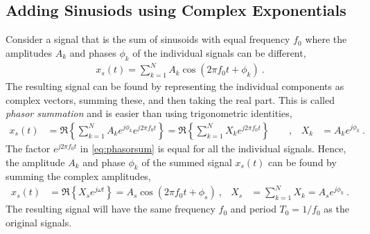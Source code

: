 \subsection{Adding Sinusiods using Complex Exponentials}
Consider a signal that is the sum of sinusoids with equal frequency $f_0$ where the amplitudes $A_k$ and phases $\phi_k$ of the individual signals can be different, 
\begin{align}
	x_s(t)= \sum_{k=1}^{N} A_k \cos(2\pi f_0 t + \phi_k)   \:.
\end{align}
The resulting signal can be found by representing the individual components as complex vectors, summing these, and then taking the real part. This is called \emph{phasor summation} and is easier than using trigonometric identities, 
\begin{align}
	x_s(t)&= \Re\left\{ \sum_{k=1}^{N}  A_k e^{j\phi_k} e^{j2\pi f_0 t } \right\}  
			= \Re\left\{ \sum_{k=1}^{N}  X_k  e^{j2\pi f_0 t } \right\}  \qquad ,  &
	X_k &= A_k e^{j\phi_k} \:.
	\label{eq:phasorsum}
\end{align}
The factor $ e^{j2\pi f_0 t}$ in \eqref{eq:phasorsum} is equal for all the individual signals.
Hence, the amplitude $A_k$ and phase $\phi_k$ of the summed signal $x_s(t)$ can be found by summing the complex amplitudes, 
\begin{align}
	x_s(t)&= \Re \left\{ X_s e^{j\omega t } \right\} = A_s \cos(2\pi f_0 t + \phi_s)  \:,
	 &  X_s&= \sum_{k=1}^{N} X_k = A_s e^{j\phi_k}  \:.
\end{align}
The resulting signal will have the same frequency $f_0$ and period $T_0=1/f_0$ as the original signals. 

